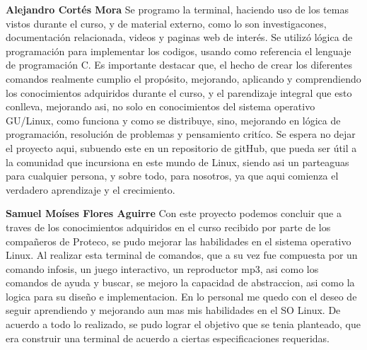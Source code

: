 \documentclass{article}
\begin{document}
\fontsize{14}{8}\selectfont

\textbf{Alejandro Cortés Mora}
Se programo la terminal, haciendo uso de los temas vistos durante el curso, y de material externo, como lo son investigacones, documentación relacionada, videos y paginas web de interés. Se utilizó lógica de programación para implementar los codigos, usando como referencia el lenguaje de programación C. Es importante destacar que, el hecho de crear los diferentes comandos realmente cumplio el propósito, mejorando, aplicando y comprendiendo los conocimientos adquiridos durante el curso, y el parendizaje integral que esto conlleva, mejorando asi, no solo en conocimientos del sistema operativo GU/Linux, como funciona y como se distribuye, sino, mejorando en lógica de programación, resolución de problemas y pensamiento critíco. Se espera no dejar el proyecto aqui, subuendo este en un repositorio de gitHub, que pueda ser útil a la comunidad que incursiona en este mundo de Linux, siendo asi un parteaguas para cualquier persona, y sobre todo, para nosotros, ya que aqui comienza el verdadero aprendizaje y el crecimiento.  

\vspace{0.5cm}
\textbf{Samuel Moíses Flores Aguirre}
Con este proyecto podemos concluir que a traves de los conocimientos adquiridos en el curso recibido por parte de los compañeros de Proteco, se pudo mejorar las habilidades en el sistema operativo Linux. Al realizar esta terminal de comandos, que a su vez fue compuesta por un comando infosis, un juego interactivo, un reproductor mp3, asi como los comandos de ayuda y buscar, se mejoro la capacidad de abstraccion, asi como la logica para su diseño e implementacion. En lo personal me quedo con el deseo de seguir aprendiendo y mejorando aun mas mis habilidades en el SO Linux.
De acuerdo a todo lo realizado, se pudo lograr el objetivo que se tenia planteado, que era construir una terminal de acuerdo a ciertas especificaciones requeridas. 
\end{document}
